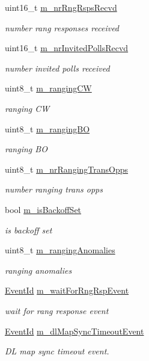 \begin{DoxyCompactItemize}
uint16\+\_\+t \hyperlink{classns3_1_1SSLinkManager_a52b9d5b8bc2d27a3ef604735ee731afc}{m\+\_\+nr\+Rng\+Rsps\+Recvd}
\begin{DoxyCompactList}\small\item\em number rang responses received \end{DoxyCompactList}\item 
uint16\+\_\+t \hyperlink{classns3_1_1SSLinkManager_a2f3459e882c316ec2f2423199d7a6349}{m\+\_\+nr\+Invited\+Polls\+Recvd}
\begin{DoxyCompactList}\small\item\em number invited polls received \end{DoxyCompactList}\item 
uint8\+\_\+t \hyperlink{classns3_1_1SSLinkManager_a953fd1e9c0db4af722a3db216a710ea1}{m\+\_\+ranging\+CW}
\begin{DoxyCompactList}\small\item\em ranging CW \end{DoxyCompactList}\item 
uint8\+\_\+t \hyperlink{classns3_1_1SSLinkManager_a15d8026ec20372ce2855c237591af9f5}{m\+\_\+ranging\+BO}
\begin{DoxyCompactList}\small\item\em ranging BO \end{DoxyCompactList}\item 
uint8\+\_\+t \hyperlink{classns3_1_1SSLinkManager_a5847dd2b913c5b70cd3a4ea1c9bbb8c4}{m\+\_\+nr\+Ranging\+Trans\+Opps}
\begin{DoxyCompactList}\small\item\em number ranging trans opps \end{DoxyCompactList}\item 
bool \hyperlink{classns3_1_1SSLinkManager_aacf699c5c88344a4ed0f27f5f4558ea3}{m\+\_\+is\+Backoff\+Set}
\begin{DoxyCompactList}\small\item\em is backoff set \end{DoxyCompactList}\item 
uint8\+\_\+t \hyperlink{classns3_1_1SSLinkManager_af2f529561d4191695c6b4dc049dbda04}{m\+\_\+ranging\+Anomalies}
\begin{DoxyCompactList}\small\item\em ranging anomalies \end{DoxyCompactList}\item 
\hyperlink{classns3_1_1EventId}{Event\+Id} \hyperlink{classns3_1_1SSLinkManager_a6e94b74ad20fe217bf121b94deeca1ba}{m\+\_\+wait\+For\+Rng\+Rsp\+Event}
\begin{DoxyCompactList}\small\item\em wait for rang response event \end{DoxyCompactList}\item 
\hyperlink{classns3_1_1EventId}{Event\+Id} \hyperlink{classns3_1_1SSLinkManager_a28189a9eb7f8a42e106b8929992a9f7a}{m\+\_\+dl\+Map\+Sync\+Timeout\+Event}
\begin{DoxyCompactList}\small\item\em DL map sync timeout event. \end{DoxyCompactList}\end{DoxyCompactItemize}
